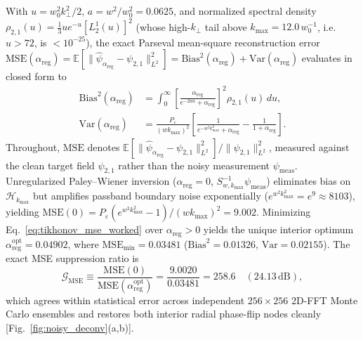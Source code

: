 \documentclass[aps,pra,onecolumn,notitlepage,11pt,tightenlines,nofootinbib,floatfix,longbibliography]{revtex4-2}
\newcommand{\norm}[1]{\lVert #1 \rVert}
\begin{document}
With $u = w_0^2 k_\perp^2/2$, $a = w^2/w_0^2 = 0.0625$, and normalized spectral density $\rho_{2,1}(u) = \frac{1}{3}u e^{-u}[L_2^1(u)]^2$ (whose high-$k_\perp$ tail above $k_{\max} = 12.0\,w_0^{-1}$, i.e.\ $u > 72$, is $< 10^{-25}$), the exact Parseval mean-square reconstruction error $\mathrm{MSE}(\alpha_{\mathrm{reg}}) = \mathbb{E}[\norm{\hat{\psi}_{\alpha_{\mathrm{reg}}} - \psi_{2,1}}_{L^2}^2] = \mathrm{Bias}^2(\alpha_{\mathrm{reg}}) + \mathrm{Var}(\alpha_{\mathrm{reg}})$ evaluates in closed form to
\begin{align}
\mathrm{Bias}^2(\alpha_{\mathrm{reg}}) &= \int_0^\infty \left[\frac{\alpha_{\mathrm{reg}}}{e^{-2au} + \alpha_{\mathrm{reg}}}\right]^2 \rho_{2,1}(u)\,du, \nonumber \\
\mathrm{Var}(\alpha_{\mathrm{reg}}) &= \frac{P_\varepsilon}{(w k_{\max})^2} \left[\frac{1}{e^{-w^2 k_{\max}^2} + \alpha_{\mathrm{reg}}} - \frac{1}{1 + \alpha_{\mathrm{reg}}}\right].
\label{eq:tikhonov_mse_worked}
\end{align}
Throughout, $\mathrm{MSE}$ denotes $\mathbb{E}[\norm{\hat{\psi}_{\alpha_{\mathrm{reg}}} - \psi_{2,1}}_{L^2}^2]/\norm{\psi_{2,1}}_{L^2}^2$, measured against the clean target field $\psi_{2,1}$ rather than the noisy measurement $\psi_{\mathrm{meas}}$. Unregularized Paley--Wiener inversion ($\alpha_{\mathrm{reg}} = 0$, $S_{w,k_{\max}}^{-1}\psi_{\mathrm{meas}}$) eliminates bias on $\mathcal{H}_{k_{\max}}$ but amplifies passband boundary noise exponentially ($e^{w^2 k_{\max}^2} = e^9 \approx 8103$), yielding $\mathrm{MSE}(0) = P_\varepsilon(e^{w^2 k_{\max}^2} - 1)/(w k_{\max})^2 = 9.002$. Minimizing Eq.~\eqref{eq:tikhonov_mse_worked} over $\alpha_{\mathrm{reg}} > 0$ yields the unique interior optimum $\alpha_{\mathrm{reg}}^{\mathrm{opt}} = 0.04902$, where $\mathrm{MSE}_{\min} = 0.03481$ ($\mathrm{Bias}^2 = 0.01326$, $\mathrm{Var} = 0.02155$). The exact MSE suppression ratio is
\begin{equation}
\mathcal{G}_{\mathrm{MSE}} \equiv \frac{\mathrm{MSE}(0)}{\mathrm{MSE}(\alpha_{\mathrm{reg}}^{\mathrm{opt}})} = \frac{9.0020}{0.03481} = 258.6 \quad (24.13\,\mathrm{dB}),
\label{eq:mse_ratio_exact}
\end{equation}
which agrees within statistical error across independent $256\times 256$ 2D-FFT Monte Carlo ensembles and restores both interior radial phase-flip nodes cleanly [Fig.~\ref{fig:noisy_deconv}(a,b)].
\end{document}
